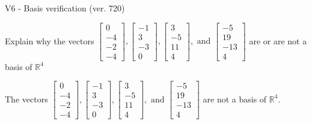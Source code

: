 \begin{exercise}
  \begin{exerciseTitle}V6 - Basis verification (ver. 720)\end{exerciseTitle}
  \begin{exerciseStatement}
    Explain why the vectors \(\left[\begin{array}{r}
0 \\
-4 \\
-2 \\
-4
\end{array}\right] , \left[\begin{array}{r}
-1 \\
3 \\
-3 \\
0
\end{array}\right] , \left[\begin{array}{r}
3 \\
-5 \\
11 \\
4
\end{array}\right] , \text{ and } \left[\begin{array}{r}
-5 \\
19 \\
-13 \\
4
\end{array}\right]\) are or are not a basis of \(\mathbb{R}^4\)	


  \end{exerciseStatement}
  \begin{exerciseAnswer}
   The vectors \(\left[\begin{array}{r}
0 \\
-4 \\
-2 \\
-4
\end{array}\right] , \left[\begin{array}{r}
-1 \\
3 \\
-3 \\
0
\end{array}\right] , \left[\begin{array}{r}
3 \\
-5 \\
11 \\
4
\end{array}\right] , \text{ and } \left[\begin{array}{r}
-5 \\
19 \\
-13 \\
4
\end{array}\right]\) 
  	 are not  a basis of \(\mathbb{R}^4\).
  


  \end{exerciseAnswer}
\end{exercise}